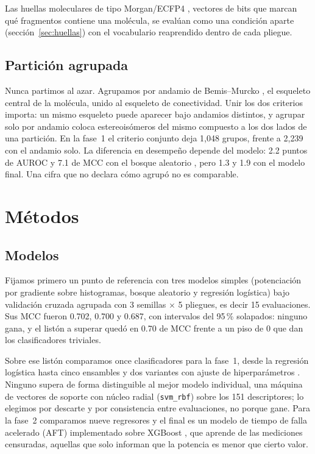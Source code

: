 \documentclass[twocolumn,10pt,letterpaper]{article}
\begin{document}
Las huellas moleculares de tipo Morgan/ECFP4 \autocite{rogers2010ecfp}, vectores de bits que marcan qué fragmentos contiene una molécula, se evalúan como una condición aparte (sección~\ref{sec:huellas}) con el vocabulario reaprendido dentro de cada pliegue.

\subsection{Partición agrupada}
\label{sec:particion}

Nunca partimos al azar. Agrupamos por andamio de Bemis--Murcko \autocite{bemis1996properties}, el esqueleto central de la molécula, unido al esqueleto de conectividad. Unir los dos criterios importa: un mismo esqueleto puede aparecer bajo andamios distintos, y agrupar solo por andamio coloca estereoisómeros del mismo compuesto a los dos lados de una partición. En la fase~1 el criterio conjunto deja 1,048 grupos, frente a 2,239 con el andamio solo. La diferencia en desempeño depende del modelo: 2.2 puntos de AUROC y 7.1 de MCC con el bosque aleatorio \autocite{breiman2001}, pero 1.3 y 1.9 con el modelo final. Una cifra que no declara cómo agrupó no es comparable.

\section{Métodos}

\subsection{Modelos}

Fijamos primero un punto de referencia con tres modelos simples (potenciación por gradiente sobre histogramas, bosque aleatorio y regresión logística) bajo validación cruzada agrupada con 3 semillas $\times$ 5 pliegues, es decir 15 evaluaciones. Sus MCC fueron 0.702, 0.700 y 0.687, con intervalos del 95\,\% solapados: ninguno gana, y el listón a superar quedó en 0.70 de MCC frente a un piso de 0 que dan los clasificadores triviales.

Sobre ese listón comparamos once clasificadores para la fase~1, desde la regresión logística hasta cinco ensambles y dos variantes con ajuste de hiperparámetros \autocite{hastie2009,pedregosa2011}. Ninguno supera de forma distinguible al mejor modelo individual, una máquina de vectores de soporte con núcleo radial (\texttt{svm\_rbf}) sobre los 151 descriptores; lo elegimos por descarte y por consistencia entre evaluaciones, no porque gane. Para la fase~2 comparamos nueve regresores y el final es un modelo de tiempo de falla acelerado (AFT) implementado sobre XGBoost \autocite{chen2016xgboost}, que aprende de las mediciones censuradas, aquellas que solo informan que la potencia es menor que cierto valor.
\end{document}
